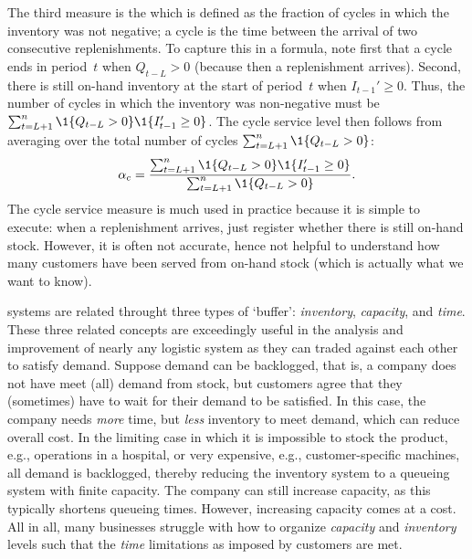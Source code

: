 \documentclass[queueing-book.tex]{subfiles}
\begin{document}
The third measure is the  which is defined as the fraction of cycles in which the inventory was not negative; a cycle is the time between the arrival of two consecutive replenishments.
To capture this in a formula, note first that a cycle ends in period~$t$ when $Q_{t-L}> 0$ (because then a replenishment arrives).
Second, there is still on-hand inventory at the start of period~$t$ when $I_{t-1}'\geq 0$.
Thus, the number of cycles in which the inventory was non-negative must be $\sum_{t=L+1}^n \1{Q_{t-L}>0}\1{I_{t-1}'\geq 0}$.
The cycle service level then follows from averaging over the total number of cycles $\sum_{t=L+1}^n \1{Q_{t-L}>0}$:
\begin{equation*}
\alpha_c =  \frac{\sum_{t=L+1}^n \1{Q_{t-L}>0}\1{I_{t-1}'\geq 0}}{\sum_{t=L+1}^n \1{Q_{t-L}>0}}.
\end{equation*}
The cycle service measure is much used in practice because it is simple to execute: when a replenishment arrives, just register whether there is still on-hand stock.
However, it is often not accurate, hence not  helpful to understand how many customers have been served from on-hand stock (which is actually what we want to know).

 systems are related throught three types of `buffer': \emph{inventory}, \emph{capacity}, and \emph{time}.
These three related concepts are exceedingly useful
in the analysis and improvement of nearly any logistic system as they can traded against each other to satisfy demand.
Suppose demand can be backlogged, that is, a company does not have meet (all) demand from stock, but customers agree that they (sometimes) have to wait for their demand to be satisfied.
In this case, the company needs \emph{more} time, but \emph{less} inventory to meet demand, which can reduce overall cost.
In the limiting case in which it is impossible to stock the product, e.g., operations in a hospital, or very expensive, e.g., customer-specific machines, all demand is backlogged, thereby reducing the inventory system to a queueing system with finite capacity.
The company can still increase capacity, as this typically shortens queueing times.
However, increasing capacity comes at a cost.
All in all, many businesses struggle with how to organize \emph{capacity} and \emph{inventory} levels such that the \emph{time} limitations as imposed by customers are met.
\end{document}
